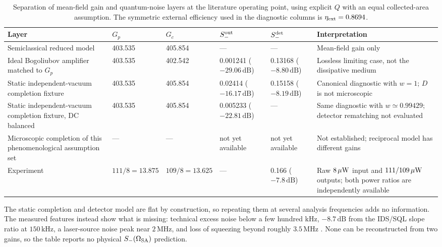\documentclass[11pt,a4paper]{article}
\newcommand{\MHz}{\,\mathrm{MHz}}
\newcommand{\kHz}{\,\mathrm{kHz}}
\newcommand{\dB}{\,\mathrm{dB}}
\newcommand{\pending}{\textcolor{amber}{not yet available}}
\begin{document}
\begin{table}[ht]
\centering
\caption{Separation of mean-field gain and quantum-noise layers at the
literature operating point, using explicit $Q$ with an equal collected-area
assumption. The symmetric external efficiency used in the diagnostic
columns is $\eta_{\rm ext}=0.8694$.}
\label{tab:model-layer-comparison}
\small
\begin{tabularx}{\textwidth}{L{3.7cm}C{1.35cm}C{1.35cm}C{1.8cm}C{1.8cm}Y}
\toprule
Layer & $G_p$ & $G_c$ & $S_-^{\rm out}$ & $S_-^{\rm det}$ &
Interpretation\\
\midrule
Semiclassical reduced model & 403.535 & 405.854 & --- & --- &
Mean-field gain only\\
Ideal Bogoliubov amplifier matched to $G_p$ & 403.535 & 402.542 &
0.001241 ($-29.06\dB$) & 0.13168 ($-8.80\dB$) &
Lossless limiting case, not the dissipative medium\\
Static independent-vacuum completion fixture & 403.535 & 405.854 &
0.02414 ($-16.17\dB$) & 0.15158 ($-8.19\dB$) &
Canonical diagnostic with $w=1$; $D$ is not microscopic\\
Static independent-vacuum completion fixture, DC balanced & 403.535 & 405.854 &
0.005233 ($-22.81\dB$) & --- &
Same diagnostic with $w\simeq0.99429$; detector rematching not evaluated\\
Microscopic completion of this phenomenological assumption set & --- & --- &
\pending & \pending & Not established; reciprocal model has different gains\\
Experiment \cite{Sim2025} & $111/8=13.875$ & $109/8=13.625$ & --- &
0.166 ($-7.8\dB$) & Raw $8\,\mu{\rm W}$ input and $111/109\,\mu{\rm W}$
outputs; both power ratios are independently available\\
\bottomrule
\end{tabularx}
\end{table}

The static completion and detector model are flat by construction, so
repeating them at several analysis frequencies adds no information. The
measured features instead show what is missing: technical excess noise below a
few hundred kHz, $-8.7\dB$ from the IDS/SQL slope ratio at $150\kHz$, a
laser-source noise peak near $2\MHz$, and loss of squeezing beyond roughly
$3.5\MHz$ \cite{Sim2025}. None can be reconstructed from two gains, so the
table reports no physical $S_-(\Omega_{\rm SA})$ prediction.
\end{document}
